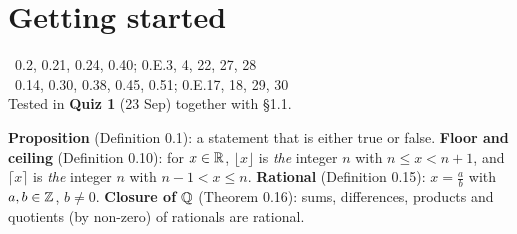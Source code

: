 \setcounter{chapter}{-1}
\chapter{Getting started}
%
{\fE\ 0.2, 0.21, 0.24, 0.40; 0.E.3, 4, 22, 27, 28\\ \fR\ 0.14, 0.30, 0.38, 0.45, 0.51; 0.E.17, 18, 29, 30\\ Tested in \textbf{Quiz 1} (23 Sep) together with \S1.1.}


\begin{key}
\textbf{Proposition} (Definition 0.1): a statement that is either true or false. \textbf{Floor and ceiling} (Definition 0.10): for $x\in\mathbb{R}$, $\lfloor x\rfloor$ is \emph{the} integer $n$ with $n\le x<n+1$, and $\lceil x\rceil$ is \emph{the} integer $n$ with $n-1<x\le n$. \textbf{Rational} (Definition 0.15): $x=\frac ab$ with $a,b\in\mathbb{Z}$, $b\ne0$. \textbf{Closure of $\mathbb{Q}$} (Theorem 0.16): sums, differences, products and quotients (by non-zero) of rationals are rational.
\end{key}

